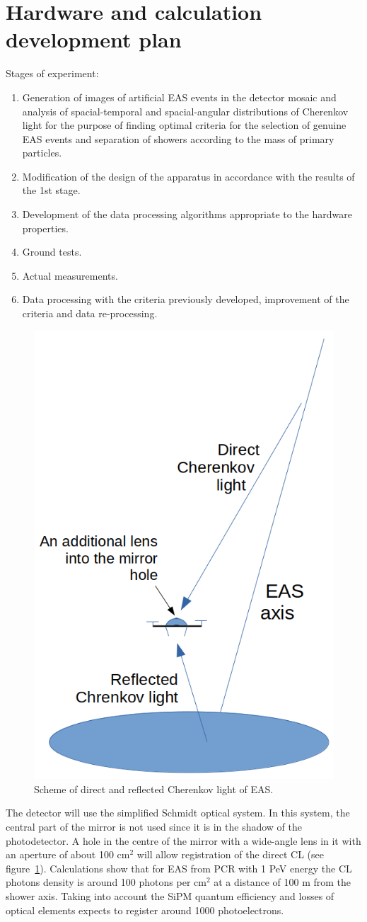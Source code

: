 \documentclass[a4paper,11pt]{article}
\begin{document}
\section{Hardware and calculation development plan}

Stages of experiment:
\begin{enumerate}
\item Generation of images of artificial EAS events in the detector mosaic and analysis of spacial-temporal and spacial-angular distributions of Cherenkov light for the purpose of finding optimal criteria for the selection of genuine EAS events and separation of showers according to the mass of primary particles.
\item Modification of the design of the apparatus in accordance with the results of the 1st stage.
\item Development of the data processing algorithms appropriate to the hardware properties.
\item Ground tests.
\item Actual measurements.
\item Data processing with the criteria previously developed, improvement of the criteria and data re-processing.
\end{enumerate}


\begin{figure}[t]
\centering %
\includegraphics[width=.35\textwidth]{DirectCL.png}
\caption{\label{fig:DirectCL} Scheme of direct and reflected Cherenkov light of EAS.}
\end{figure}

The detector will use the simplified Schmidt optical system. In this system, the central part of the mirror is not used since it is in the shadow of the photodetector. A hole in the centre of the mirror with a wide-angle lens in it with an aperture of about 100 cm$^2$ will allow registration of the direct CL (see figure~\ref{fig:DirectCL}). Calculations show that for EAS from PCR with 1 PeV energy the CL photons density is around 100 photons per cm$^2$ at a distance of 100 m from the shower axis. Taking into account the SiPM quantum efficiency and losses of optical elements expects to register around 1000 photoelectrons.
\end{document}
